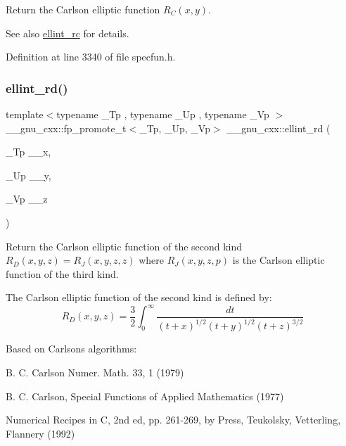 Return the Carlson elliptic function $ R_C(x,y) $.

\begin{DoxySeeAlso}{See also}
\hyperlink{group__mathsf__gnu_ga7d3d42f5f71a74266be8aaca528056bf}{ellint\+\_\+rc} for details. 
\end{DoxySeeAlso}


Definition at line 3340 of file specfun.\+h.

\mbox{\label{group__mathsf__gnu_gad29dae6abc783c8fe952dba477e65309}} 
\subsubsection{\texorpdfstring{ellint\+\_\+rd()}{ellint\_rd()}}
{\footnotesize\ttfamily template$<$typename \+\_\+\+Tp , typename \+\_\+\+Up , typename \+\_\+\+Vp $>$ \\
\+\_\+\+\_\+gnu\+\_\+cxx\+::fp\+\_\+promote\+\_\+t$<$\+\_\+\+Tp, \+\_\+\+Up, \+\_\+\+Vp$>$ \+\_\+\+\_\+gnu\+\_\+cxx\+::ellint\+\_\+rd (\begin{DoxyParamCaption}\item[{\+\_\+\+Tp}]{\+\_\+\+\_\+x,  }\item[{\+\_\+\+Up}]{\+\_\+\+\_\+y,  }\item[{\+\_\+\+Vp}]{\+\_\+\+\_\+z }\end{DoxyParamCaption})\hspace{0.3cm}{\ttfamily [inline]}}

Return the Carlson elliptic function of the second kind $ R_D(x,y,z) = R_J(x,y,z,z) $ where $ R_J(x,y,z,p) $ is the Carlson elliptic function of the third kind.

The Carlson elliptic function of the second kind is defined by\+: \[ R_D(x,y,z) = \frac{3}{2} \int_0^\infty \frac{dt}{(t + x)^{1/2}(t + y)^{1/2}(t + z)^{3/2}} \]

Based on Carlson\textquotesingle{}s algorithms\+:
\begin{DoxyItemize}
\item B. C. Carlson Numer. Math. 33, 1 (1979)
\item B. C. Carlson, Special Functions of Applied Mathematics (1977)
\item Numerical Recipes in C, 2nd ed, pp. 261-\/269, by Press, Teukolsky, Vetterling, Flannery (1992)
\end{DoxyItemize}


